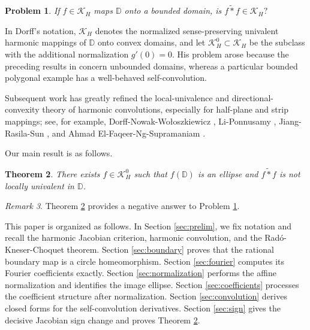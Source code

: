 \documentclass[11pt,reqno]{amsart}
\numberwithin{equation}{section}
\newtheorem{theorem}{Theorem}[section]
\theoremstyle{definition}
\newtheorem{problem}[theorem]{Problem}
\theoremstyle{remark}
\newtheorem{remark}[theorem]{Remark}
\newcommand{\D}{\mathbb D}
\newcommand{\KH}{\mathcal K_H}
\newcommand{\KHZ}{\mathcal K_H^0}
\newcommand{\convh}{\mathbin{\widetilde *}}
\newcommand{\Jac}{J}
\begin{document}
\begin{problem}
\cite[Question 10]{Dorff2001}\label{q:Dorff}
{\it If $f\in\KH$ maps $\D$ onto a bounded domain, is
\(
  f\convh f\in\KH?
\)}
\end{problem}

In Dorff's notation, $\KH$ denotes the normalized sense-preserving univalent harmonic mappings of $\D$ onto convex domains, and let \(\KH^0\subset \KH\) be the subclass with the additional normalization \(g'(0)=0\).  His problem arose because the preceding results in \cite{Dorff2001} concern unbounded domains, whereas a particular bounded polygonal example has a well-behaved self-convolution.

Subsequent work has greatly refined the local-univalence and directional-convexity theory of harmonic convolutions, especially for half-plane and strip mappings; see, for example, Dorff-Nowak-Wo\l oszkiewicz \cite{DorffNowakWoloszkiewicz2012}, Li-Ponnusamy \cite{LiPonnusamy2013,LiPonnusamy2019,LiPonnusamy2022}, Jiang-Rasila-Sun \cite{SunJiangRasila2015}, and Ahmad El-Faqeer-Ng-Supramaniam \cite{ElFaqeerEtAl2021}.  

Our main result is as follows.


\begin{theorem}\label{thm:main}
There exists $f\in\KHZ$ such that $f(\D)$ is an ellipse and
\(
 f\convh f
\)
is not locally univalent in $\D$. 
\end{theorem}

\begin{remark}\label{rem:strong-failure}
{\rm Theorem \ref{thm:main} provides a negative answer to Problem \ref{q:Dorff}.}
\end{remark}




This paper is organized as follows.
In Section \ref{sec:prelim}, we fix notation and recall the harmonic Jacobian criterion, harmonic convolution, and the Rad\'o-Kneser-Choquet theorem.  Section \ref{sec:boundary} proves that the rational boundary map is a circle homeomorphism.  Section \ref{sec:fourier} computes its Fourier coefficients exactly. Section \ref{sec:normalization} performs the affine normalization and identifies the image ellipse. 
Section \ref{sec:coefficients} processes the coefficient structure after normalization. 
Section \ref{sec:convolution} derives closed forms for the self-convolution derivatives.  Section \ref{sec:sign} gives the decisive Jacobian sign change and proves Theorem \ref{thm:main}. 
\end{document}
